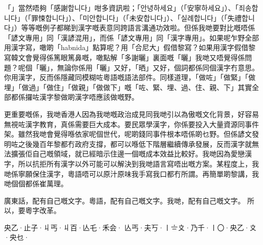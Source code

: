 「{\koreanfont {}}」當然唔夠「感謝{\koreanfont 합니다}」咁多資訊啦；「{\koreanfont 안녕하세요}」（「安寧{\koreanfont  하세요}」）、「{\koreanfont  죄송합니다}」（「罪悚{\koreanfont 합니다}」）、「{\koreanfont 미안합니다}」（「未安{\koreanfont 합니다}」）、「{\koreanfont  실례합니다}」（「失禮{\koreanfont 합니다}」）等等嘅例子都睇到漢字嘅表意同跨語言溝通功效啦。但係我哋要對比嘅唔係「諺文專用」同「漢諺混用」，而係「諺文專用」同「漢字專用」。如果呢乍野全部用漢字寫，噉啲「habnida」點算呢？用「合尼大」假借黎寫？如果用漢字假借黎寫韓文會覺得係篤眼篤鼻嘅，噉點解「多謝曬」裏面嘅「曬」我哋又唔覺得係問題？呢個「曬」，無論你係用「曬」又好，「晒」又好，個詞都係同個漢字冇意思。你用漢字，反而係隱藏同模糊咗粵語嘅語法部件。同樣道理，「做咗」「做緊」「做埋」「做過」「做住」「做親」「做做下」嘅「咗、緊、埋、過、住、親、下」其實全部都係攞咗漢字黎做啲漢字唔應該做嘅野。

更重要嘅係，我哋香港人因為我哋嘅政治成見同我哋引以為傲嘅文化背景，好容易無視咗漢字教育，真係需要巨大成本。要民眾學漢字，你係要投入大量資源同事件架。雖然我哋會覺得喺依家呢個世代，呢啲錢同事件根本唔係啲乜野。但係諺文發明咗之後幾百年黎都冇政府支撐，都可以喺低下階層繼續傳承發展，反而漢字就無法擴張佢自己嘅領域，就已經暗示住邊一個嘅成本效益比較好。我哋因為愛戀漢字，所以抗拒所有漢字以外可能可以解決到我哋語言寫唔出嘅方案。某程度上，我哋係寧願保住漢字，粵語唔可以原汁原味我手寫我口都冇所謂。再簡單啲黎講，我哋個個都係崔萬理。

廣東話，配有自己嘅文字。粵語，配有自己嘅文字。我哋，配有自己嘅文字。
所以，要粵字改革。

央乙·止子·丩丐·丩百·亾乇·禾会·
亾丐·夫丂·〡〧〩·乃千·〡〇·央乙·〩·央乜·


